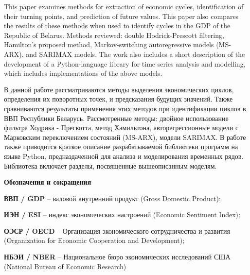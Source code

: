 \documentclass[a4paper,14pt]{extreport}
\begin{document}
	\maketitle
	

	\clearpage
	
	\renewcommand{\contentsname}{Содержание}
	\tableofcontents
	
	\clearpage
	
	\bsuabstract
	{
		This paper examines methods for extraction of economic cycles, identification of their turning points, and prediction of future values. This paper also compares the results of these methods when used to identify cycles in the GDP of the Republic of Belarus. Methods reviewed: double Hodrick-Prescott filtering, Hamilton's proposed method,  Markov-switching autoregressive models (MS-ARX), and SARIMAX models. The work also includes a short description of the development of a Python-language library for time series analysis and modelling, which includes implementations of the above models.
		
	}{
		В данной работе рассматриваются методы выделения экономических циклов, определения их поворотных точек, и предсказания будущих значений. Также сравниваются результаты применения этих методов при идентификации циклов в ВВП Республики Беларусь. Рассмотренные методы: двойное использование фильтра Ходрика - Прескотта, метод Хамильтона, авторегрессионные модели с Марковским переключением состояний (MS-ARX), модели SARIMAX. В работе также приводится краткое описание разрабатываемой библиотеки программ на языке Python, предназдаченной для анализа и моделирования временных рядов. Библиотека включает разделы, посвященные вышеописанным моделям.
	}
	
	\clearpage
	{
		\centering\normalfont\Large\bfseries{Обозначения и сокращения} \par
		\nopagebreak %
	}

	\textbf{ВВП / GDP} -- валовой внутренний продукт (Gross Domestic Product);
	
	\textbf{ИЭН / ESI} -- индекс экономических настроений (Economic Sentiment Index);
	
	\textbf{ОЭСР / OECD} -- Организация экономического сотрудничества и развития (Organization for Economic Cooperation and Development);
	
	\textbf{НБЭИ / NBER} -- Национальное бюро экономических исследований США (National Bureau of Economic Research)
	
\end{document}
